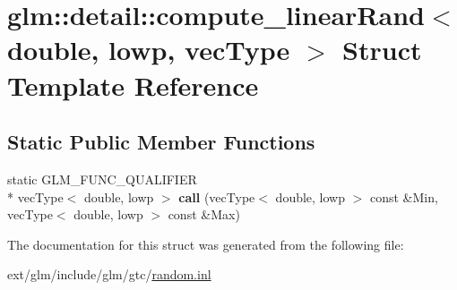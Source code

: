 \hypertarget{structglm_1_1detail_1_1compute__linear_rand_3_01double_00_01lowp_00_01vec_type_01_4}{\section{glm\-:\-:detail\-:\-:compute\-\_\-linear\-Rand$<$ double, lowp, vec\-Type $>$ Struct Template Reference}
\label{structglm_1_1detail_1_1compute__linear_rand_3_01double_00_01lowp_00_01vec_type_01_4}
}
\subsection*{Static Public Member Functions}
\begin{DoxyCompactItemize}
\item 
\hypertarget{structglm_1_1detail_1_1compute__linear_rand_3_01double_00_01lowp_00_01vec_type_01_4_a87f42da70174985a5b6c772a0b540818}{static G\-L\-M\-\_\-\-F\-U\-N\-C\-\_\-\-Q\-U\-A\-L\-I\-F\-I\-E\-R \\*
vec\-Type$<$ double, lowp $>$ {\bfseries call} (vec\-Type$<$ double, lowp $>$ const \&Min, vec\-Type$<$ double, lowp $>$ const \&Max)}\label{structglm_1_1detail_1_1compute__linear_rand_3_01double_00_01lowp_00_01vec_type_01_4_a87f42da70174985a5b6c772a0b540818}

\end{DoxyCompactItemize}


The documentation for this struct was generated from the following file\-:\begin{DoxyCompactItemize}
\item 
ext/glm/include/glm/gtc/\hyperlink{random_8inl}{random.\-inl}\end{DoxyCompactItemize}
